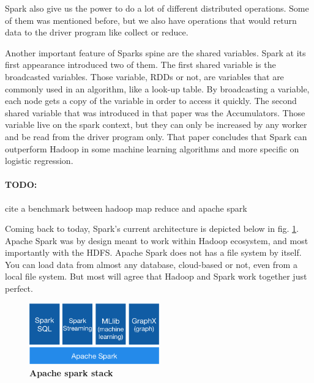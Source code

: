 Spark also give us the power to do a lot of different distributed operations. Some of them was mentioned before, but we also have operations that would return data to the driver program like collect or reduce. 

Another important feature of Sparks spine are the shared variables. Spark at its first appearance introduced two of them. The first shared variable is the broadcasted variables. Those variable, RDDs or not, are variables that are commonly used in an algorithm, like a look-up table. By broadcasting a variable, each node gets a copy of the variable in order to access it quickly. The second shared variable that was introduced in that paper was the Accumulators. Those variable live on the spark context, but they can only be increased by any worker and be read from the driver program only. That paper concludes that Spark can outperform Hadoop in some machine learning algorithms and more specific on logistic regression.

\paragraph{TODO:} cite a benchmark between hadoop map reduce and apache spark

Coming back to today, Spark's current architecture is depicted below in fig. \ref{apacheSparkStack}.
Apache Spark was by design meant to work within Hadoop ecosystem, and most importantly with the HDFS. Apache Spark does not has a file system by itself. You can load data from almost any database, cloud-based or not, even from a local file system. But most will agree that Hadoop and Spark work together just perfect.

\begin{figure}[ht]
  \centering
    \includegraphics[width=0.5\textwidth]{images/spark-stack.png}
    \caption{\bfseries Apache spark stack \cite{ApacheSpark:1}}
   \label{apacheSparkStack}
\end{figure}


